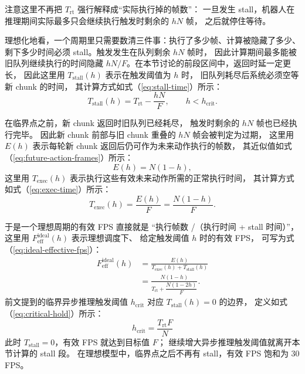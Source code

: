 注意这里不再把 $T_{\text{rt}}$ 强行解释成``实际执行掉的帧数''：
一旦发生 stall，机器人在推理期间实际最多只会继续执行触发时剩余的 $hN$ 帧，
之后就停住等待。

理想化地看，一个周期里只需要数清三件事：执行了多少帧、计算被隐藏了多少、
剩下多少时间必须 stall。触发发生在队列剩余 $hN$ 帧时，
因此计算期间最多能被旧队列继续执行的时间隐藏
$hN/F$。在本节讨论的前段区间中，返回时延一定更长，
因此这里用 $T_{\text{stall}}(h)$ 表示在触发阈值为 $h$ 时，
旧队列耗尽后系统必须空等新 chunk 的时间，
其计算方式如式（\ref{eq:stall-time}）所示：
\begin{equation}
  T_{\text{stall}}(h)
  =
  T_{\text{rt}}-\frac{hN}{F},
  \qquad h<h_{\text{crit}}.
  \label{eq:stall-time}
\end{equation}

在临界点之前，新 chunk 返回时旧队列已经耗尽，
触发时剩余的 $hN$ 帧也已经执行完毕。
因此新 chunk 前部与旧 chunk 重叠的 $hN$ 帧会被判定为过期，
这里用 $E(h)$ 表示每轮新 chunk 返回后仍可作为未来动作执行的帧数，
其近似值如式（\ref{eq:future-action-frames}）所示：
\begin{equation}
  E(h) = N(1-h),
  \label{eq:future-action-frames}
\end{equation}
这里用 $T_{\text{exec}}(h)$ 表示执行这些有效未来动作所需的正常执行时间，
其计算方式如式（\ref{eq:exec-time}）所示：
\begin{equation}
  T_{\text{exec}}(h) = \frac{E(h)}{F}
  = \frac{N(1-h)}{F}.
  \label{eq:exec-time}
\end{equation}

于是一个理想周期的有效 FPS 直接就是
``执行帧数 /（执行时间 + stall 时间）''，
这里用 $F_{\text{eff}}^{\text{ideal}}(h)$ 表示理想调度下、
给定触发阈值 $h$ 时的有效 FPS，
可写为式（\ref{eq:ideal-effective-fps}）：
\begin{equation}
  \begin{aligned}
  F_{\text{eff}}^{\text{ideal}}(h)
  &=
  \frac{E(h)}{T_{\text{exec}}(h)+T_{\text{stall}}(h)} \\
  &=
  \frac{N(1-h)}
       {T_{\text{rt}}+\dfrac{N(1-2h)}{F}}.
  \end{aligned}
  \label{eq:ideal-effective-fps}
\end{equation}
前文提到的临界异步推理触发阈值 $h_{\text{crit}}$
对应 $T_{\text{stall}}(h)=0$ 的边界，
定义如式（\ref{eq:critical-hold}）所示：
\begin{equation}
  h_{\text{crit}} = \frac{T_{\text{rt}}F}{N}
  \label{eq:critical-hold}
\end{equation}
此时 $T_{\text{stall}}=0$，有效 FPS 就达到目标值 $F$；
继续增大异步推理触发阈值就离开本节计算的 stall 段。
在理想模型中，临界点之后不再有 stall，有效 FPS 饱和为 30 FPS。

